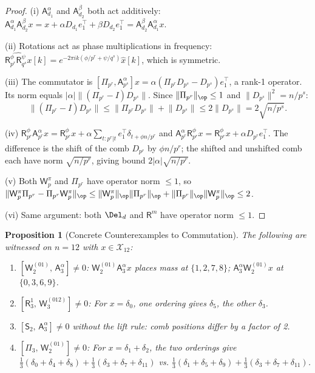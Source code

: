 \documentclass[11pt]{amsart}
\newtheorem{proposition}[theorem]{Proposition}
\newcommand{\Prj}{\Pi}
\newcommand{\Sp}{\mathsf{S}}
\newcommand{\Ap}{\mathsf{A}}
\newcommand{\Rp}{\mathsf{R}}
\newcommand{\Wp}{\mathsf{W}}
\newcommand{\norm}[1]{\lVert #1 \rVert}
\begin{document}
\begin{proof}
(i) $\Ap^\alpha_{d_1}$ and $\Ap^\beta_{d_2}$ both act additively: $\Ap^\alpha_{d_1}\Ap^\beta_{d_2} x = x + \alpha D_{d_1}e_1^\top + \beta D_{d_2}e_1^\top = \Ap^\beta_{d_2}\Ap^\alpha_{d_1} x$.

(ii) Rotations act as phase multiplications in frequency: $\hat{\Rp^\phi_{p^r}\Rp^\psi_{q^s} x}[k] = e^{-2\pi ik(\phi/p^r + \psi/q^s)}\hat{x}[k]$, which is symmetric.

(iii) The commutator is $[\Prj_{p^r}, \Ap^\alpha_{p^s}]x = \alpha(\Prj_{p^r}D_{p^s} - D_{p^s})e_1^\top$, a rank-1 operator. Its norm equals $|\alpha|\norm{(\Prj_{p^r} - I)D_{p^s}}$. Since $\norm{\Prj_{p^r}}_\op \leq 1$ and $\norm{D_{p^s}}^2 = n/p^s$:
\[
  \norm{(\Prj_{p^r} - I)D_{p^s}} \leq \norm{\Prj_{p^r} D_{p^s}} + \norm{D_{p^s}} \leq 2\norm{D_{p^s}} = 2\sqrt{n/p^s}.
\]

(iv) $\Rp^\phi_{p^r}\Ap^\alpha_{p^r} x = \Rp^\phi_{p^r} x + \alpha\sum_{t: p^r|t} e_1^\top \delta_{t+\phi n/p^r}$ and $\Ap^\alpha_{p^r}\Rp^\phi_{p^r} x = \Rp^\phi_{p^r}x + \alpha D_{p^r}e_1^\top$. The difference is the shift of the comb $D_{p^r}$ by $\phi n/p^r$; the shifted and unshifted comb each have norm $\sqrt{n/p^r}$, giving bound $2|\alpha|\sqrt{n/p^r}$.

(v) Both $\Wp^\pi_p$ and $\Prj_{p^r}$ have operator norm $\leq 1$, so $\norm{\Wp^\pi_p \Prj_{p^r} - \Prj_{p^r}\Wp^\pi_p}_\op \leq \norm{\Wp^\pi_p}_\op\norm{\Prj_{p^r}}_\op + \norm{\Prj_{p^r}}_\op\norm{\Wp^\pi_p}_\op \leq 2$.

(vi) Same argument: both $\Del_d$ and $\Rp^m$ have operator norm $\leq 1$.
\end{proof}

\begin{proposition}[Concrete Counterexamples to Commutation]\label{prop:counterexamples}
The following are witnessed on $n = 12$ with $x \in \mathcal{X}_{12}$:
\begin{enumerate}
  \item $[\Wp^{(01)}_2,\, \Ap^\alpha_3] \neq 0$: $\Wp^{(01)}_2\Ap^\alpha_3 x$ places mass at $\{1,2,7,8\}$; $\Ap^\alpha_3\Wp^{(01)}_2 x$ at $\{0,3,6,9\}$.
  \item $[\Rp^1_3,\, \Wp^{(012)}_3] \neq 0$: For $x = \delta_0$, one ordering gives $\delta_5$, the other $\delta_3$.
  \item $[\Sp_2,\, \Ap^\alpha_3] \neq 0$ without the lift rule: comb positions differ by a factor of 2.
  \item $[\Prj_3,\, \Wp^{(01)}_2] \neq 0$: For $x = \delta_1 + \delta_2$, the two orderings give $\frac{1}{3}(\delta_0+\delta_4+\delta_8) + \frac{1}{3}(\delta_3+\delta_7+\delta_{11})$ vs. $\frac{1}{3}(\delta_1+\delta_5+\delta_9) + \frac{1}{3}(\delta_3+\delta_7+\delta_{11})$.
\end{enumerate}
\end{proposition}
\end{document}
